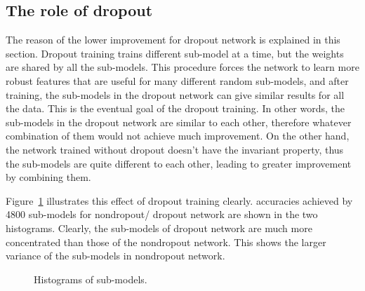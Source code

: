 \documentclass{article} %
\begin{document}
\subsection{The role of dropout}
The reason of the lower improvement for dropout network is explained in this section. Dropout training trains different sub-model at a time, but the weights are shared by all the sub-models. This procedure forces the network to learn more robust features that are useful for many different random sub-models, and after training, the sub-models in the dropout network can give similar results for all the data. This is the eventual goal of the dropout training. In other words, the sub-models in the dropout network are similar to each other, therefore whatever combination of them would not achieve much improvement. On the other hand, the network trained without dropout doesn't have the invariant property, thus the sub-models are quite different to each other, leading to greater improvement by combining them.
\par
Figure~\ref{hist} illustrates this effect of dropout training clearly. accuracies achieved by 4800 sub-models for nondropout/ dropout network are shown in the two histograms. Clearly, the sub-models of dropout network are much more concentrated than those of the nondropout network. This shows the larger variance of the sub-models in nondropout network.
\begin{figure}
\centering 
{} 
\caption{ Histograms of sub-models.}
\label{hist} 
\end{figure}
\end{document}
